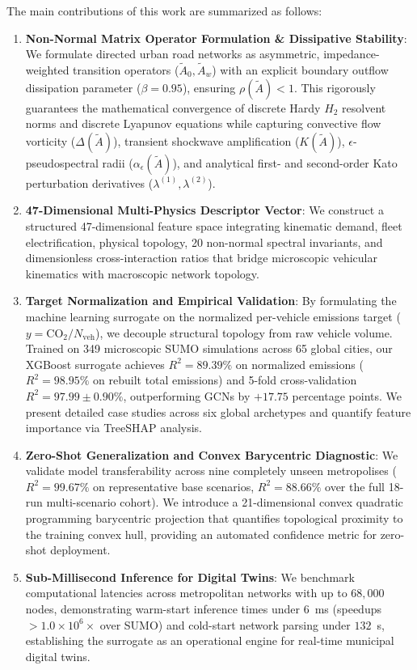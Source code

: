 \documentclass[journal]{IEEEtran}
\begin{document}
The main contributions of this work are summarized as follows:
\begin{enumerate}
    \item \textbf{Non-Normal Matrix Operator Formulation \& Dissipative Stability}: We formulate directed urban road networks as asymmetric, impedance-weighted transition operators ($\tilde{A}_0, \tilde{A}_w$) with an explicit boundary outflow dissipation parameter ($\beta = 0.95$), ensuring $\rho(\tilde{A}) < 1$. This rigorously guarantees the mathematical convergence of discrete Hardy $H_2$ resolvent norms and discrete Lyapunov equations while capturing convective flow vorticity ($\Delta(\tilde{A})$), transient shockwave amplification ($K(\tilde{A})$), $\epsilon$-pseudospectral radii ($\alpha_\epsilon(\tilde{A})$), and analytical first- and second-order Kato perturbation derivatives ($\lambda^{(1)}, \lambda^{(2)}$).
    \item \textbf{47-Dimensional Multi-Physics Descriptor Vector}: We construct a structured 47-dimensional feature space integrating kinematic demand, fleet electrification, physical topology, 20 non-normal spectral invariants, and dimensionless cross-interaction ratios that bridge microscopic vehicular kinematics with macroscopic network topology.
    \item \textbf{Target Normalization and Empirical Validation}: By formulating the machine learning surrogate on the normalized per-vehicle emissions target ($y = \text{CO}_2 / N_{\text{veh}}$), we decouple structural topology from raw vehicle volume. Trained on 349 microscopic SUMO simulations across 65 global cities, our XGBoost surrogate achieves $R^2 = 89.39\%$ on normalized emissions ($R^2 = 98.95\%$ on rebuilt total emissions) and 5-fold cross-validation $R^2 = 97.99 \pm 0.90\%$, outperforming GCNs by $+17.75$ percentage points. We present detailed case studies across six global archetypes and quantify feature importance via TreeSHAP analysis.
    \item \textbf{Zero-Shot Generalization and Convex Barycentric Diagnostic}: We validate model transferability across nine completely unseen metropolises ($R^2 = 99.67\%$ on representative base scenarios, $R^2 = 88.66\%$ over the full 18-run multi-scenario cohort). We introduce a 21-dimensional convex quadratic programming barycentric projection that quantifies topological proximity to the training convex hull, providing an automated confidence metric for zero-shot deployment.
    \item \textbf{Sub-Millisecond Inference for Digital Twins}: We benchmark computational latencies across metropolitan networks with up to $68,000$ nodes, demonstrating warm-start inference times under $6$~ms (speedups $> 1.0 \times 10^6 \times$ over SUMO) and cold-start network parsing under $132$~s, establishing the surrogate as an operational engine for real-time municipal digital twins.
\end{enumerate}
\end{document}
